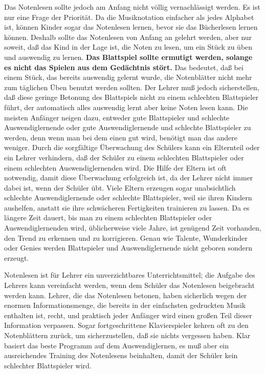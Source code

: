 Das Notenlesen sollte jedoch am Anfang nicht völlig vernachlässigt werden.
Es ist nur eine Frage der Priorität.
Da die Musiknotation einfacher als jedes Alphabet ist, können Kinder sogar das Notenlesen lernen, bevor sie das Bücherlesen lernen können.
Deshalb sollte das Notenlesen von Anfang an gelehrt werden, aber nur soweit, daß das Kind in der Lage ist, die Noten zu lesen, um ein Stück zu üben und auswendig zu lernen.
\textbf{Das Blattspiel sollte ermutigt werden, solange es nicht das Spielen aus dem Gedächtnis stört.}
Das bedeutet, daß bei einem Stück, das bereits auswendig gelernt wurde, die Notenblätter nicht mehr zum täglichen Üben benutzt werden sollten.
Der Lehrer muß jedoch sicherstellen, daß diese geringe Betonung des Blattspiels nicht zu einem schlechten Blattspieler führt, der automatisch alles auswendig lernt aber keine Noten lesen kann.
Die meisten Anfänger neigen dazu, entweder gute Blattspieler und schlechte Auswendiglernende oder gute Auswendiglernende und schlechte Blattspieler zu werden, denn wenn man bei dem einen gut wird, benötigt man das andere weniger.
Durch die sorgfältige Überwachung des Schülers kann ein Elternteil oder ein Lehrer verhindern, daß der Schüler zu einem schlechten Blattspieler oder einem schlechten Auswendiglernenden wird.
Die Hilfe der Eltern ist oft notwendig, damit diese Überwachung erfolgreich ist, da der Lehrer nicht immer dabei ist, wenn der Schüler übt.
Viele Eltern erzeugen sogar unabsichtlich schlechte Auswendiglernende oder schlechte Blattspieler, weil sie ihren Kindern aushelfen, anstatt sie ihre schwächeren Fertigkeiten trainieren zu lassen.
Da es längere Zeit dauert, bis man zu einem schlechten Blattspieler oder Auswendiglernenden wird, üblicherweise viele Jahre, ist genügend Zeit vorhanden, den Trend zu erkennen und zu korrigieren.
Genau wie Talente, Wunderkinder oder Genies werden Blattspieler und Auswendiglernende nicht geboren sondern erzeugt.

Notenlesen ist für Lehrer ein unverzichtbares Unterrichtsmittel; die Aufgabe des Lehrers kann vereinfacht werden, wenn dem Schüler das Notenlesen beigebracht werden kann.
Lehrer, die das Notenlesen betonen, haben sicherlich wegen der enormen Informationsmenge, die bereits in der einfachsten gedruckten Musik enthalten ist, recht, und praktisch jeder Anfänger wird einen großen Teil dieser Information verpassen.
Sogar fortgeschrittene Klavierspieler kehren oft zu den Notenblättern zurück, um sicherzustellen, daß sie nichts vergessen haben.
Klar basiert das beste Programm auf dem Auswendiglernen, es muß aber ein ausreichendes Training des Notenlesens beinhalten, damit der Schüler kein schlechter Blattspieler wird.

